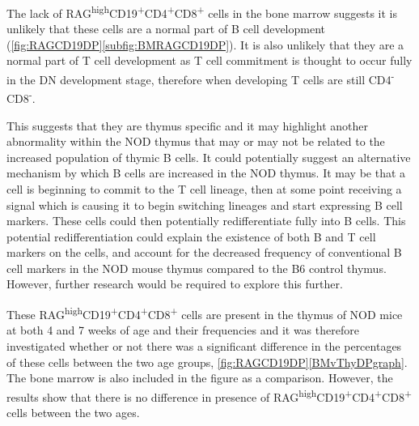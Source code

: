 
The lack of RAG\textsuperscript{high}CD19\textsuperscript{+}CD4\textsuperscript{+}CD8\textsuperscript{+} cells in the bone marrow suggests it is unlikely that these cells are a normal part of B cell development (\cref{fig:RAGCD19DP}\ref{subfig:BMRAGCD19DP}). %
It is also unlikely that they are a normal part of T cell development as T cell commitment is thought to occur fully in the DN development stage, therefore when developing T cells are still CD4\textsuperscript{-}CD8\textsuperscript{-}.

This suggests that they are thymus specific and it may highlight another abnormality within the NOD thymus that may or may not be related to the increased population of thymic B cells.
It could potentially suggest an alternative mechanism by which B cells are increased in the NOD thymus. 
It may be that a cell is beginning to commit to the T cell lineage, then at some point receiving a signal which is causing it to begin switching lineages and start expressing B cell markers.
These cells could then potentially redifferentiate fully into B cells.
This potential redifferentiation could explain the existence of both B and T cell markers on the cells, and account for the decreased frequency of conventional B cell markers in the NOD mouse thymus compared to the B6 control thymus.
However, further research would be required to explore this further.

These RAG\textsuperscript{high}CD19\textsuperscript{+}CD4\textsuperscript{+}CD8\textsuperscript{+} cells are present in the thymus of NOD mice at both 4 and 7 weeks of age and their frequencies   and it was therefore investigated whether or not there was a significant difference in the percentages of these cells between the two age groups, \cref{fig:RAGCD19DP}\ref{BMvThyDPgraph}. 
The bone marrow is also included in the figure as a comparison.
However, the results show that there is no difference in presence of RAG\textsuperscript{high}CD19\textsuperscript{+}CD4\textsuperscript{+}CD8\textsuperscript{+} cells between the two ages. 


